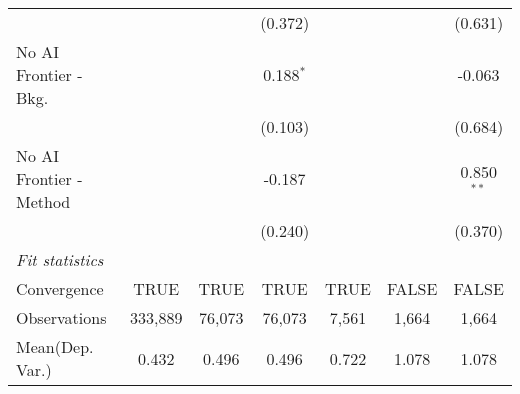 \begin{tabular}{lcccccc}
                           &               &              & (0.372)      &               &         & (0.631)\\   
   No AI Frontier - Bkg.   &               &              & 0.188$^{*}$  &               &         & -0.063\\   
                           &               &              & (0.103)      &               &         & (0.684)\\   
   No AI Frontier - Method &               &              & -0.187       &               &         & 0.850$^{**}$\\   
                           &               &              & (0.240)      &               &         & (0.370)\\   
   \midrule
   \emph{Fit statistics}\\
   Convergence             &TRUE           & TRUE         & TRUE         & TRUE          & FALSE   & FALSE\\  
   Observations            & 333,889       & 76,073       & 76,073       & 7,561         & 1,664   & 1,664\\  
Mean(Dep. Var.) & 0.432 & 0.496 & 0.496 & 0.722 & 1.078 & 1.078 \\
   

\end{tabular}
